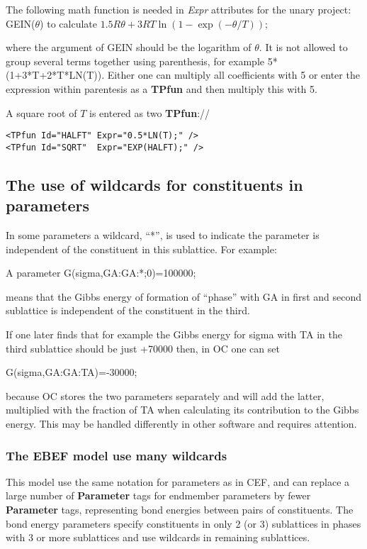 \documentclass{article}
\begin{document}
The following math function is needed in {\em Expr} attributes for the
unary project:\\

GEIN($\theta$) to calculate $1.5R\theta+3RT\ln(1-\exp(-\theta/T));$

where the argument of GEIN should be the logarithm of $\theta$.  It is
not allowed to group several terms together using parenthesis, for
example 5*(1+3*T+2*T*LN(T)).  Either one can multiply all coefficients
with 5 or enter the expression within parentesis as a {\bf TPfun} and
then multiply this with 5.

A square root of $T$ is entered as two {\bf TPfun}://
\begin{verbatim}
<TPfun Id="HALFT" Expr="0.5*LN(T);" />
<TPfun Id="SQRT"  Expr="EXP(HALFT);" />
\end{verbatim}

\newpage 

\subsection{The use of wildcards for constituents in parameters}\label{sec:wildcard}

In some parameters a wildcard, ``*'', is used to indicate the
parameter is independent of the constituent in this sublattice.  For
example:

A parameter G(sigma,GA:GA:*;0)=100000;

means that the Gibbs energy of formation of ``phase'' with GA in first
and second sublattice is independent of the constituent in the third.

If one later finds that for example the Gibbs energy for sigma with TA
in the third sublattice should be just +70000 then, in OC one can set

G(sigma,GA:GA:TA)=-30000;

because OC stores the two parameters separately and will add the
latter, multiplied with the fraction of TA when calculating its
contribution to the Gibbs energy.  This may be handled differently in
other software and requires attention.

\subsubsection{The EBEF model use many wildcards}\label{sec:ebef}

This model use the same notation for parameters as in CEF, and can
replace a large number of {\bf Parameter} tags for endmember
parameters by fewer {\bf Parameter} tags, representing bond energies
between pairs of constituents.  The bond energy parameters specify
constituents in only 2 (or 3) sublattices in phases with 3 or more
sublattices and use wildcards in remaining sublattices.
\end{document}
